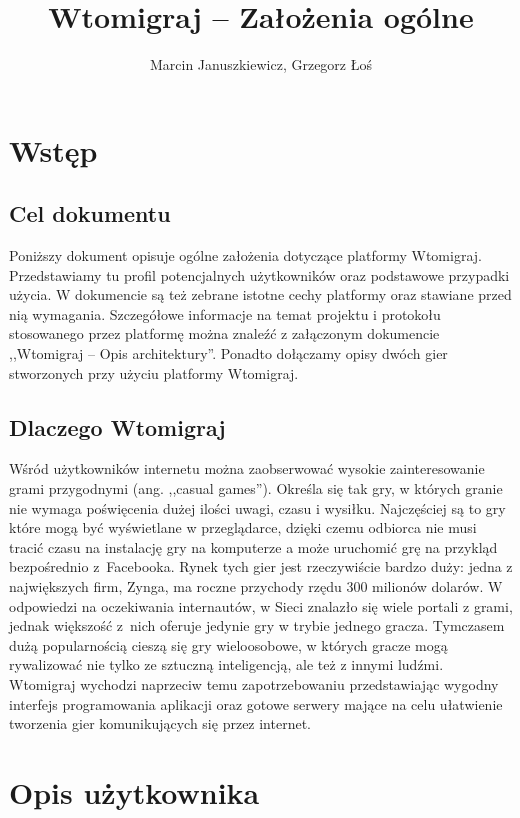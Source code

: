 \documentclass[a4paper, 12pt]{article}
\author{Marcin Januszkiewicz, Grzegorz Łoś}
\title{\textbf{Wtomigraj} -- Założenia ogólne}
\begin{document}

\break

\setcounter{page}{2}

\tableofcontents

\break

\section{Wstęp}

\subsection{Cel dokumentu}
Poniższy dokument opisuje ogólne założenia dotyczące platformy Wtomigraj. Przedstawiamy tu profil potencjalnych użytkowników oraz podstawowe przypadki użycia. W dokumencie są też zebrane istotne cechy platformy oraz stawiane przed nią wymagania. Szczegółowe informacje na temat projektu i protokołu stosowanego przez platformę można znaleźć z załączonym dokumencie ,,Wtomigraj -- Opis architektury''. Ponadto dołączamy opisy dwóch gier stworzonych przy użyciu platformy Wtomigraj.

\subsection{Dlaczego Wtomigraj}
Wśród użytkowników internetu można zaobserwować wysokie zainteresowanie grami przygodnymi (ang. ,,casual games''). Określa się tak gry, w których granie nie wymaga poświęcenia dużej ilości uwagi, czasu i wysiłku. Najczęściej są to gry które mogą być wyświetlane w przeglądarce, dzięki czemu odbiorca nie musi tracić czasu na instalację gry na komputerze a może uruchomić grę na przykląd bezpośrednio z~Facebooka. Rynek tych gier jest rzeczywiście bardzo duży: jedna z największych firm, Zynga, ma roczne przychody rzędu 300 milionów dolarów. W odpowiedzi na oczekiwania internautów, w Sieci znalazło się wiele portali z grami, jednak większość z~nich oferuje jedynie gry w trybie jednego gracza. Tymczasem dużą popularnością cieszą się gry wieloosobowe, w których gracze mogą rywalizować nie tylko ze sztuczną inteligencją, ale też z innymi ludźmi. Wtomigraj wychodzi naprzeciw temu zapotrzebowaniu przedstawiając wygodny interfejs programowania aplikacji oraz gotowe serwery mające na celu ułatwienie tworzenia gier komunikujących się przez internet.

\section[Opis użytkownika]{Opis użytkownika}
\end{document}
